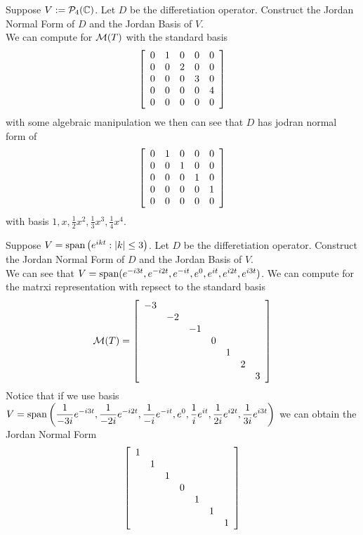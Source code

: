 \begin{example}
	Suppose $V:= \mathcal P_4(\mathbb C)$. Let $D$ be the differetiation operator. Construct the Jordan Normal Form of $D$ and the Jordan Basis of $V$. \\
	We can compute for $\mathcal M(T)$ with the standard basis
	\[ \left[ \begin{array}{ccccccccccccccccccccccccccccccccccccccccccccccccccccccccccc} 
		0 & 1 & 0 & 0 & 0 \\
		0 & 0 & 2 & 0 & 0 \\
		0 & 0 & 0 & 3 & 0 \\
		0 & 0 & 0 & 0 & 4 \\
		0 & 0 & 0 & 0 & 0 		
	\end{array} \right]\]
	with some algebraic manipulation we then can see that $D$ has jodran normal form of
	\[ \left[ \begin{array}{ccccccccccccccccccccccccccccccccccccccccccccccccccccccccccc} 
		0 & 1 & 0 & 0 & 0 \\
		0 & 0 & 1 & 0 & 0 \\
		0 & 0 & 0 & 1 & 0 \\
		0 & 0 & 0 & 0 & 1 \\
		0 & 0 & 0 & 0 & 0 		
	\end{array} \right]\]
	with basis $\displaystyle 1, x, \frac 12 x^2, \frac 13 x^3, \frac 14 x^4$.
\end{example}
\begin{example}
	Suppose $V = \text{span} \left( e^{ikt} : |k| \leq 3 \right)$. Let $D$ be the differetiation operator. Construct the Jordan Normal Form of $D$ and the Jordan Basis of $V$. \\
	We can see that $V = \text{span} (e^{-i3t},e^{-i2t},e^{-it},e^{0},e^{it},e^{i2t},e^{i3t})$. We can compute for the matrxi representation with repsect to the standard basis
	\[ \mathcal M(T) = \left[ \begin{array}{ccccccccccccccccccccccccccccccccccccccccccccccccccccccccccc} 
	-3 \\
	& -2 \\
	&& -1 \\
	&&& 0 \\
	&&&& 1 \\
	&&&&& 2 \\
	&&&&&& 3 
	\end{array} \right]\]
	Notice that if we use basis $\displaystyle V = \text{span} \left(\frac{1}{-3i} e^{-i3t}, \frac{1}{-2i}e^{-i2t},\frac{1}{-i}e^{-it}, e^{0}, \frac{1}{i}e^{it}, \frac{1}{2i}e^{i2t}, \frac{1}{3i}e^{i3t}\right)$ we can obtain the Jordan Normal Form
	\[ \left[ \begin{array}{ccccccccccccccccccccccccccccccccccccccccccccccccccccccccccc} 1 \\
	& 1 \\
	&& 1 \\
	&&& 0 \\
	&&&& 1 \\
	&&&&& 1 \\
	&&&&&& 1 \end{array} \right]\]
\end{example}
\newpage
